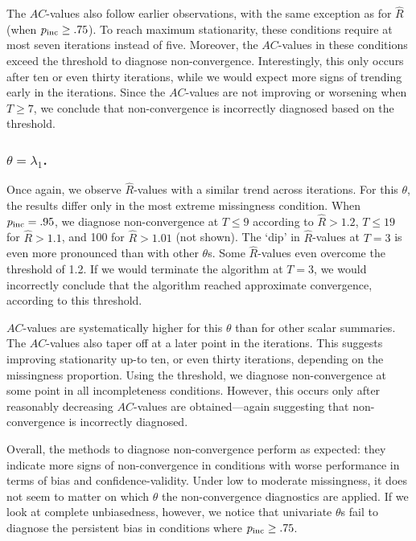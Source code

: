 \documentclass[Royal,times,sageh]{sagej}
\begin{document}
The \(AC\)-values also follow earlier observations, with the same exception as for \(\widehat{R}\) (when \(p_{\rm inc}\geq.75\)). To reach maximum stationarity, these conditions require at most seven iterations instead of five. Moreover, the \(AC\)-values in these conditions exceed the threshold to diagnose non-convergence. Interestingly, this only occurs after ten or even thirty iterations, while we would expect more signs of trending early in the iterations. Since the \(AC\)-values are not improving or worsening when \(T\geq7\), we conclude that non-convergence is incorrectly diagnosed based on the threshold.

\hypertarget{thetalambda_1.}{%
\subsubsection{\texorpdfstring{\(\theta=\lambda_{1}\).}{\textbackslash theta=\textbackslash lambda\_\{1\}.}}\label{thetalambda_1.}}

Once again, we observe \(\widehat{R}\)-values with a similar trend across iterations. For this \(\theta\), the results differ only in the most extreme missingness condition. When \(p_{\rm inc}=.95\), we diagnose non-convergence at \(T\leq9\) according to \(\widehat{R}>1.2\), \(T\leq19\) for \(\widehat{R}>1.1\), and 100 for \(\widehat{R}>1.01\) (not shown). The `dip' in \(\widehat{R}\)-values at \(T=3\) is even more pronounced than with other \(\theta\)s. Some \(\widehat{R}\)-values even overcome the threshold of 1.2. If we would terminate the algorithm at \(T=3\), we would incorrectly conclude that the algorithm reached approximate convergence, according to this threshold.

\(AC\)-values are systematically higher for this \(\theta\) than for other scalar summaries. The \(AC\)-values also taper off at a later point in the iterations. This suggests improving stationarity up-to ten, or even thirty iterations, depending on the missingness proportion. Using the threshold, we diagnose non-convergence at some point in all incompleteness conditions. However, this occurs only after reasonably decreasing \(AC\)-values are obtained---again suggesting that non-convergence is incorrectly diagnosed. \newline  

\noindent Overall, the methods to diagnose non-convergence perform as expected: they indicate more signs of non-convergence in conditions with worse performance in terms of bias and confidence-validity. Under low to moderate missingness, it does not seem to matter on which \(\theta\) the non-convergence diagnostics are applied. If we look at complete unbiasedness, however, we notice that univariate \(\theta\)s fail to diagnose the persistent bias in conditions where \(p_{\rm inc}\geq.75\).
\end{document}
